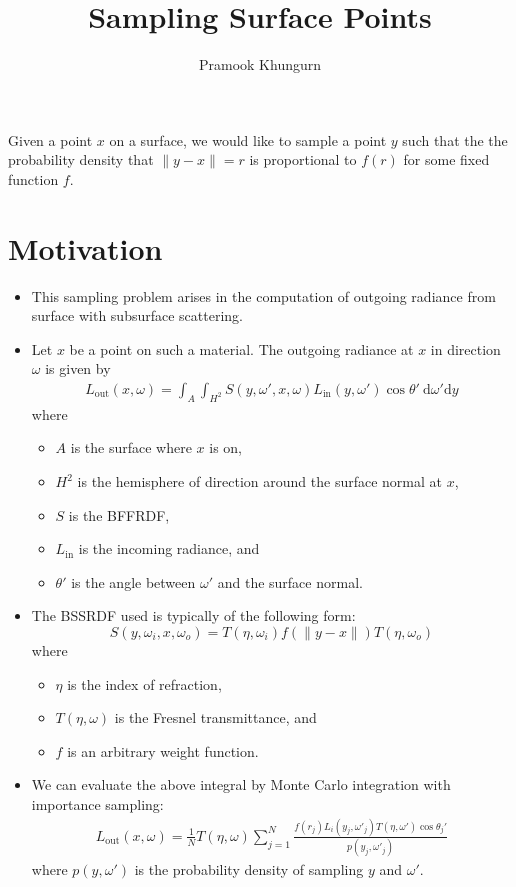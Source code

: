 \documentclass[10pt]{article}
\title{Sampling Surface Points}
\author{Pramook Khungurn}
\newcommand{\dee}{\mathrm{d}}
\newcommand{\In}{\mathrm{in}}
\newcommand{\Out}{\mathrm{out}}
\begin{document}
	\maketitle
	
Given a point $x$ on a surface, we would like to sample
a point $y$ such that the the probability density that
$\| y - x \| = r$ is proportional to $f(r)$ for some fixed
function $f$.

\section{Motivation}

\begin{itemize}
	\item This sampling problem arises in the computation of outgoing radiance 
	from surface with subsurface scattering. 
	
	\item Let $x$ be a point on such a material. 
	The outgoing radiance at $x$ in direction $\omega$ is given by	
	\begin{align*}
		L_{\Out}(x, \omega) = 
		\int_A \int_{H^2} S(y,\omega' ,x,\omega) 
		L_{\In}(y, \omega') \cos \theta' \ \dee \omega' \dee y
	\end{align*}
	where
	\begin{itemize}
		\item $A$ is the surface where $x$ is on,
		\item $H^2$ is the hemisphere of direction around the surface normal at $x$,
		\item $S$ is the BFFRDF,
		\item $L_{\In}$	is the incoming radiance, and
		\item $\theta'$ is the angle between $\omega'$ and the surface normal.
	\end{itemize}

	\item The BSSRDF used is typically of the following form:
		$$ S(y,\omega_i,x,\omega_o) = T(\eta, \omega_i) 
		f(\| y-x \|) T(\eta,\omega_o)$$ 
	where
	\begin{itemize}
		\item $\eta$ is the index of refraction,
		\item $T(\eta,\omega)$ is the Fresnel transmittance, and
		\item $f$ is an arbitrary weight function.
	\end{itemize}
		
	\item We can evaluate the above integral by Monte Carlo 
	integration with importance sampling:
	\begin{align*}
		L_\Out(x, \omega) = \frac{1}{N} T(\eta, \omega) 
			\sum_{j=1}^N 
				\frac
				{
					f(r_j) L_i(y_j,\omega'_j) T(\eta, \omega') \cos \theta_j'
				}
				{ p(y_j, \omega'_j) }				
	\end{align*}
	where $p(y,\omega')$ is the probability density of sampling $y$ and 
	$\omega'$.


\end{itemize}
\end{document}
